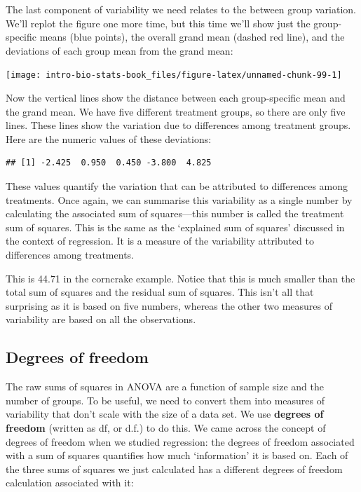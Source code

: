\documentclass[
]{book}
\begin{document}
The last component of variability we need relates to the between group variation. We'll replot the figure one more time, but this time we'll show just the group-specific means (blue points), the overall grand mean (dashed red line), and the deviations of each group mean from the grand mean:

\begin{center}\texttt{[image: intro-bio-stats-book\_files/figure-latex/unnamed-chunk-99-1]} \end{center}

Now the vertical lines show the distance between each group-specific mean and the grand mean. We have five different treatment groups, so there are only five lines. These lines show the variation due to differences among treatment groups. Here are the numeric values of these deviations:

\begin{verbatim}
## [1] -2.425  0.950  0.450 -3.800  4.825
\end{verbatim}

These values quantify the variation that can be attributed to differences among treatments. Once again, we can summarise this variability as a single number by calculating the associated sum of squares---this number is called the treatment sum of squares. This is the same as the `explained sum of squares' discussed in the context of regression. It is a measure of the variability attributed to differences among treatments.

This is 44.71 in the corncrake example. Notice that this is much smaller than the total sum of squares and the residual sum of squares. This isn't all that surprising as it is based on five numbers, whereas the other two measures of variability are based on all the observations.

\hypertarget{degrees-of-freedom}{%
\subsection{Degrees of freedom}\label{degrees-of-freedom}}

The raw sums of squares in ANOVA are a function of sample size and the number of groups. To be useful, we need to convert them into measures of variability that don't scale with the size of a data set. We use \textbf{degrees of freedom} (written as df, or d.f.) to do this. We came across the concept of degrees of freedom when we studied regression: the degrees of freedom associated with a sum of squares quantifies how much `information' it is based on. Each of the three sums of squares we just calculated has a different degrees of freedom calculation associated with it:
\end{document}

